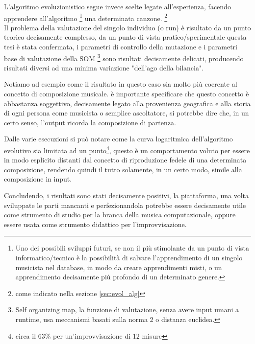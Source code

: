 L'algoritmo evoluzionistico segue invece scelte legate all'esperienza,
facendo apprendere all'algoritmo
\footnote{Uno dei possibili sviluppi futuri, se non il più stimolante da un
punto di vista informatico/tecnico è la possibilità di salvare l'apprendimento
di un singolo musicista nel database, in modo da creare apprendimenti misti,
o un apprendimento decisamente più profondo di un determinato genere.}
una determinata canzone. \footnote{come indicato nella sezione \ref{sec:evol_alg}}
\\
Il problema della valutazione del singolo individuo (o run) è risultato da un
punto teorico decisamente complesso, da un punto di vista pratico/sperimentale
questa tesi è stata confermata, i parametri di controllo della mutazione e
i parametri base di valutazione della SOM
\footnote{Self organizing map, la funzione di valutazione,
senza avere input umani a runtime, usa meccanismi basati sulla norma 2
o distanza euclidea.}
sono risultati decisamente delicati, producendo risultati diversi ad una minima
variazione "dell'ago della bilancia".


Notiamo ad esempio come il risultato in questo caso sia molto più coerente al
concetto di composizione musicale.
è importante specificare che questo concetto è abbastanza soggettivo,
decisamente legato alla provenienza geografica e alla storia di ogni persona
come musicista o semplice ascoltatore, si potrebbe dire che, in un certo senso,
l'output ricorda la composizione di partenza.

Dalle varie esecuzioni si può notare come la curva logaritmica dell'algoritmo
evolutivo sia limitata ad un punto\footnote{circa il 63\% per un'improvvisazione
di 12 misure}, questo è un comportamento voluto
per essere in modo esplicito distanti dal concetto di riproduzione fedele di una
determinata composizione, rendendo quindi il tutto solamente, in un certo modo,
simile alla composizione in input.

Concludendo, i risultati sono stati decisamente positivi, la piattaforma, una volta
sviluppate le parti mancanti e perfezionandola potrebbe essere decisamente utile
come strumento di studio per la branca della musica computazionale, oppure
essere usata come strumento didattico per l'improvvisazione.

